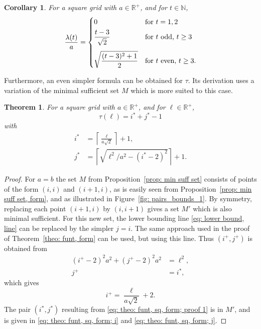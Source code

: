 \documentclass[12pt, a4paper]{article}
\newcommand{\funt}{\tau} %
\newcommand{\funl}{\lambda} %
\newcommand{\len}{\ell} %
\newcommand{\tiles}{t} %
\newcommand{\isolr}{i^+}
\newcommand{\jsolr}{j^+}
\newcommand{\isoli}{i^\ast}
\newcommand{\jsoli}{j^\ast}
\newcommand{\mss}{M}
\newtheorem{theorem}{Theorem}%
\newtheorem{corollary}{Corollary}%
\begin{document}
\begin{corollary}
\label{theo: funl, sq, form}
For a square grid with $a \in \mathbb R^+$, and for $\tiles \in \mathbb N$,
\begin{equation}
\label{eq: theo: funt, sq, form; funl}\\
\frac{\funl(\tiles)}{a} = \begin{cases}
\displaystyle
0 & \text{for } \tiles =1, 2 \\[1.4mm]
\displaystyle
\frac{\tiles-3}{\sqrt{2}} & \text{for } \tiles \text{ odd, } \tiles \geq 3 \\[4.5mm]
\displaystyle
\sqrt{\frac{(\tiles-3)^2+1} {2}} & \text{for } \tiles \text{ even, } \tiles \geq 3.
\end{cases}
\end{equation}
\end{corollary}

Furthermore, an even simpler formula can be obtained for $\funt$. Its derivation uses a variation of the minimal sufficient set $\mss$ which is  more suited to this case.

\begin{theorem}
\label{theo: funt, sq, form}
For a square grid with $a \in \mathbb R^+$, and for $\len \in \mathbb R^+$,
\begin{equation}
\label{eq: theo: funt, sq, form; funt}
\funt(\len) = \isoli+\jsoli-1
\end{equation}
with
\begin{align}
\label{eq: theo: funt, sq, form; i}
\isoli &= \left\lceil \frac{\len}{a \sqrt{2}} \right\rceil + 1, \\
\label{eq: theo: funt, sq, form; j}
\jsoli &= \left\lceil \sqrt{\len^2/a^2-(\isoli-2)^2} \right\rceil + 1.
\end{align}
\end{theorem}

\begin{proof}
For $a=b$ the set $\mss$ from Proposition~\ref{prop: min suff set} consists of points of the form $(i,i)$ and $(i+1,i)$, as is easily seen from Proposition~\ref{prop: min suff set, form}, and as illustrated in Figure~\ref{fig: pairs_bounds_1}. By symmetry, replacing each point $(i+1,i)$ by $(i,i+1)$ gives a set $\mss'$ which is also minimal sufficient. For this new set, the lower bounding line \eqref{eq: lower bound, line} can be replaced by the simpler $j=i$. The same approach used in the proof of Theorem~\ref{theo: funt, form} can be used, but using this line. Thus $(\isolr, \jsolr)$ is obtained from
\begin{align}
(\isolr-2)^2 a^2 + (\jsolr-2)^2 a^2 &= \len^2, \\
\jsolr &= \isoli,
\end{align}
which gives
\begin{equation}
\label{eq: theo: funt, sq, form; proof 1}
\isolr = \frac{\len}{a \sqrt{2}} + 2.
\end{equation}
The pair $(\isoli,\jsoli)$ resulting from \eqref{eq: theo: funt, sq, form; proof 1} is in $\mss'$, and is given in \eqref{eq: theo: funt, sq, form; i} and \eqref{eq: theo: funt, sq, form; j}.
\end{proof}
\end{document}
